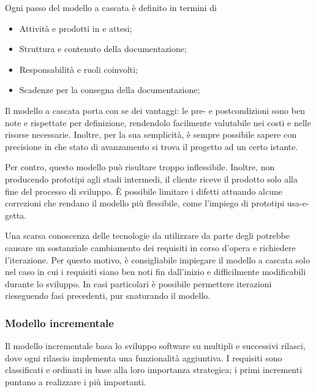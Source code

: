 Ogni passo del modello a cascata è definito in termini di

\begin{itemize}
	\item Attività e prodotti in  e  attesi;
	\item Struttura e contenuto della documentazione;
	\item Responsabilità e ruoli coinvolti;
	\item Scadenze per la consegna della documentazione;
\end{itemize}

Il modello a cascata porta con se dei vantaggi: le pre- e postcondizioni sono
ben note e rispettate per definizione, rendendolo facilmente valutabile nei
costi e nelle risorse necessarie. Inoltre, per la sua semplicità, è sempre
possibile sapere con precisione in che stato di avanzamento si trova il progetto
ad un certo istante.

Per contro, questo modello può risultare troppo inflessibile. Inoltre, non
producendo prototipi agli stadi intermedi, il cliente riceve il prodotto solo
alla fine del processo di sviluppo. È possibile limitare i difetti attuando
alcune correzioni che rendano il modello più flessibile, come l'impiego di
prototipi usa-e-getta.

Una scarsa conoscenza delle tecnologie da utilizzare da parte degli
 potrebbe causare un sostanziale cambiamento dei requisiti
in corso d'opera e richiedere l'iterazione. Per questo motivo, è consigliabile
impiegare il modello a cascata solo nel caso in cui i requisiti siano ben noti
fin dall'inizio e difficilmente modificabili durante lo sviluppo. In casi
particolari è possibile permettere iterazioni rieseguendo fasi precedenti, pur
snaturando il modello.


\subsubsection{Modello incrementale}

Il modello incrementale basa lo sviluppo software su multipli e successivi
rilasci, dove ogni rilascio implementa una funzionalità aggiuntiva. I requisiti
sono classificati e ordinati in base alla loro importanza strategica; i primi
incrementi puntano a realizzare i più importanti.

